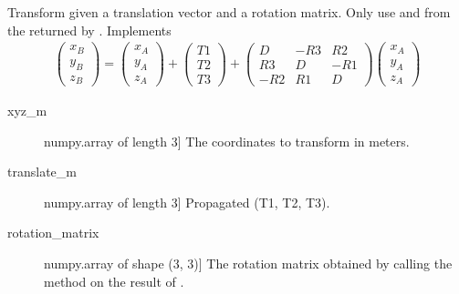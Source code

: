 \documentclass[a4paper,10pt,english]{sphinxmanual}
\begin{document}
\begin{fulllineitems}
\label{\detokenize{api-docs:etrsitrs.datumtransformation.forward_transform}}
Transform  given a translation vector and a rotation
matrix. Only use  and  from the
 returned by . Implements
\begin{equation*}
\begin{split}\left(\begin{array}{c} x_B \\ y_B \\ z_B\end{array}\right) = 
\left(\begin{array}{c} x_A \\ y_A \\ z_A\end{array}\right) +
\left(\begin{array}{c} T1 \\ T2 \\ T3\end{array}\right) +
\left(\begin{array}{ccc}
D  & -R3 &  R2 \\
R3 &  D  & -R1 \\ 
-R2 &  R1 &  D
\end{array}\right)
\left(\begin{array}{c} x_A \\ y_A \\ z_A\end{array}\right)\end{split}
\end{equation*}
\begin{description}
\item[{xyz\_m}] \leavevmode{[}numpy.array of length 3{]}
The coordinates to transform in meters.

\item[{translate\_m}] \leavevmode{[}numpy.array of length 3{]}
Propagated (T1, T2, T3).

\item[{rotation\_matrix}] \leavevmode{[}numpy.array of shape (3, 3){]}
The rotation matrix obtained by calling the
 method on the result of
.


\end{description}
\end{fulllineitems}
\end{document}
